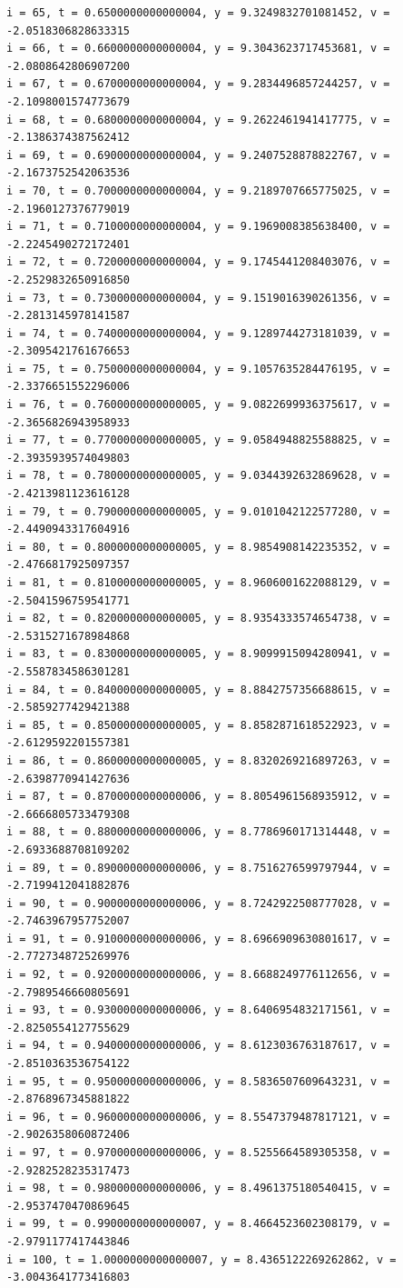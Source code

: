 \documentclass[a4j,titlepage]{jsarticle}
\begin{document}
\begin{lstlisting}[style=text,caption=課題8の実行結果,label=lst:kekka8]
i = 65, t = 0.6500000000000004, y = 9.3249832701081452, v = -2.0518306828633315
i = 66, t = 0.6600000000000004, y = 9.3043623717453681, v = -2.0808642806907200
i = 67, t = 0.6700000000000004, y = 9.2834496857244257, v = -2.1098001574773679
i = 68, t = 0.6800000000000004, y = 9.2622461941417775, v = -2.1386374387562412
i = 69, t = 0.6900000000000004, y = 9.2407528878822767, v = -2.1673752542063536
i = 70, t = 0.7000000000000004, y = 9.2189707665775025, v = -2.1960127376779019
i = 71, t = 0.7100000000000004, y = 9.1969008385638400, v = -2.2245490272172401
i = 72, t = 0.7200000000000004, y = 9.1745441208403076, v = -2.2529832650916850
i = 73, t = 0.7300000000000004, y = 9.1519016390261356, v = -2.2813145978141587
i = 74, t = 0.7400000000000004, y = 9.1289744273181039, v = -2.3095421761676653
i = 75, t = 0.7500000000000004, y = 9.1057635284476195, v = -2.3376651552296006
i = 76, t = 0.7600000000000005, y = 9.0822699936375617, v = -2.3656826943958933
i = 77, t = 0.7700000000000005, y = 9.0584948825588825, v = -2.3935939574049803
i = 78, t = 0.7800000000000005, y = 9.0344392632869628, v = -2.4213981123616128
i = 79, t = 0.7900000000000005, y = 9.0101042122577280, v = -2.4490943317604916
i = 80, t = 0.8000000000000005, y = 8.9854908142235352, v = -2.4766817925097357
i = 81, t = 0.8100000000000005, y = 8.9606001622088129, v = -2.5041596759541771
i = 82, t = 0.8200000000000005, y = 8.9354333574654738, v = -2.5315271678984868
i = 83, t = 0.8300000000000005, y = 8.9099915094280941, v = -2.5587834586301281
i = 84, t = 0.8400000000000005, y = 8.8842757356688615, v = -2.5859277429421388
i = 85, t = 0.8500000000000005, y = 8.8582871618522923, v = -2.6129592201557381
i = 86, t = 0.8600000000000005, y = 8.8320269216897263, v = -2.6398770941427636
i = 87, t = 0.8700000000000006, y = 8.8054961568935912, v = -2.6666805733479308
i = 88, t = 0.8800000000000006, y = 8.7786960171314448, v = -2.6933688708109202
i = 89, t = 0.8900000000000006, y = 8.7516276599797944, v = -2.7199412041882876
i = 90, t = 0.9000000000000006, y = 8.7242922508777028, v = -2.7463967957752007
i = 91, t = 0.9100000000000006, y = 8.6966909630801617, v = -2.7727348725269976
i = 92, t = 0.9200000000000006, y = 8.6688249776112656, v = -2.7989546660805691
i = 93, t = 0.9300000000000006, y = 8.6406954832171561, v = -2.8250554127755629
i = 94, t = 0.9400000000000006, y = 8.6123036763187617, v = -2.8510363536754122
i = 95, t = 0.9500000000000006, y = 8.5836507609643231, v = -2.8768967345881822
i = 96, t = 0.9600000000000006, y = 8.5547379487817121, v = -2.9026358060872406
i = 97, t = 0.9700000000000006, y = 8.5255664589305358, v = -2.9282528235317473
i = 98, t = 0.9800000000000006, y = 8.4961375180540415, v = -2.9537470470869645
i = 99, t = 0.9900000000000007, y = 8.4664523602308179, v = -2.9791177417443846
i = 100, t = 1.0000000000000007, y = 8.4365122269262862, v = -3.0043641773416803
\end{lstlisting}
\end{document}
